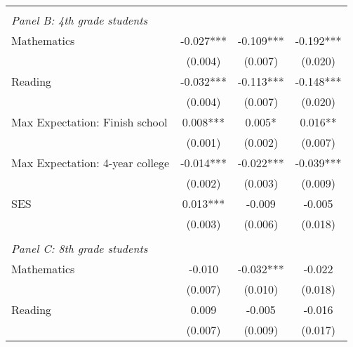 {\begin{tabular}{lccc}
&  &  &   \\
\multicolumn{4}{l}{\textit{Panel B: 4th grade students}} \\
\hspace{3mm}Mathematics&      -0.027***&      -0.109***&      -0.192***\\
                    &     (0.004)   &     (0.007)   &     (0.020)   \\
 
\hspace{3mm}Reading &      -0.032***&      -0.113***&      -0.148***\\
                    &     (0.004)   &     (0.007)   &     (0.020)   \\
 
\hspace{3mm}Max Expectation: Finish school&       0.008***&       0.005*  &       0.016** \\
                    &     (0.001)   &     (0.002)   &     (0.007)   \\
 
\hspace{3mm}Max Expectation: 4-year college&      -0.014***&      -0.022***&      -0.039***\\
                    &     (0.002)   &     (0.003)   &     (0.009)   \\
 
\hspace{3mm}SES     &       0.013***&      -0.009   &      -0.005   \\
                    &     (0.003)   &     (0.006)   &     (0.018)   \\
 
&  &  &   \\
\multicolumn{4}{l}{\textit{Panel C: 8th grade students}} \\
\hspace{3mm}Mathematics&      -0.010   &      -0.032***&      -0.022   \\
                    &     (0.007)   &     (0.010)   &     (0.018)   \\
 
\hspace{3mm}Reading &       0.009   &      -0.005   &      -0.016   \\
                    &     (0.007)   &     (0.009)   &     (0.017)   \\
 

\end{tabular}}
